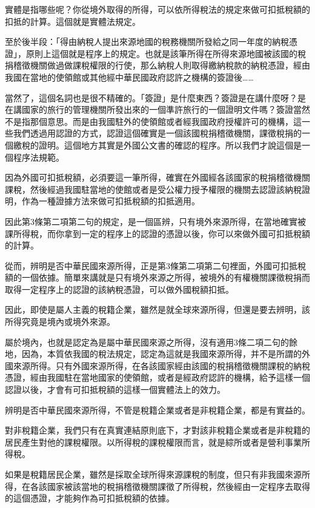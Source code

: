 \documentclass[oneside,sub3section]{ctexbook}
\begin{document}
實體是指哪些呢？你從境外取得的所得，可以依所得稅法的規定來做可扣抵稅額的扣抵的計算。這個就是實體法規定。

至於後半段：「得由納稅人提出來源地國的稅務機關所發給之同一年度的納稅憑證」，原則上這個就是程序上的規定。也就是該筆所得在所得來源地國被該國的稅捐稽徵機關做過做課稅權限的行使，那么納稅人則取得繳納稅款的納稅憑證，經由我國在當地的使領館或其他經中華民國政府認許之機構的簽證後\ldots\ldots{}

當然了，這個名詞也是很不精確的。「簽證」是什麼東西？簽證是在講什麼呀？是在講國家的旅行的管理機關所發出來的一個準許旅行的一個證明文件嗎？簽證當然不是指那個意思。而是由我國駐外的使領館或者經我國政府授權許可的機構，這一些我們透過用認證的方式，認證這個確實是一個該國稅捐稽徵機關，課徵稅捐的一個繳稅的證明。這個地方其實是外國公文書的確認的程序。所以我們才說這個是一個程序法規範。

因為外國可扣抵稅額，必須要這一筆所得，確實在外國經各該國家的稅捐稽徵機關課稅，然後經過我國駐當地的使館或者是受公權力授予權限的機關去認證該納稅證明，作為一種證據方法來做可扣抵稅額的扣抵適用。

因此第3條第二項第二句的規定，是一個區辨，只有境外來源所得，在當地確實被課所得稅，而你拿到一定的程序上的認證的憑證以後，你可以來做外國可扣抵稅額的計算。

從而，辨明是否中華民國來源所得，正是第3條第二項第二句裡面，外國可扣抵稅額的一個依據。簡單來講就是只有境外來源之所得，被境外的有權機關課徵稅捐而取得一定程序上的認證的該納稅憑證，可以做外國稅額扣抵。

因此，即使是屬人主義的稅籍企業，雖然是就全球來源所得，但還是要去辨明，該所得究竟是境內或境外來源。

屬於境內，也就是認定為是屬中華民國來源之所得，沒有適用3條二項二句的餘地，因為，本質依我國的稅法規定，認定為這就是我國來源所得，并不是所謂的外國來源所得。只有外國來源所得，在各該國家經由該國的稅捐稽徵機關課稅的納稅憑證，經由我國駐在當地國家的使領館，或者是經政府認許的機構，給予這樣一個認證以後，才會有可扣抵稅額的這樣一個實體法上的效力。

辨明是否中華民國來源所得，不管是稅籍企業或者是非稅籍企業，都是有實益的。

對非稅籍企業，我們只有在真實連結原則底下，才對該非稅籍企業或者是非稅籍的居民產生對他的課稅權限。以所得稅的課稅權限而言，就是綜所或者是營利事業所得稅。

如果是稅籍居民企業，雖然是採取全球所得來源課稅的制度，但只有非我國來源所得，在各該國家被該當地的稅捐稽徵機關課徵了所得稅，然後經由一定程序去取得的這個憑證，才能夠作為可扣抵稅額的依據。
\end{document}

